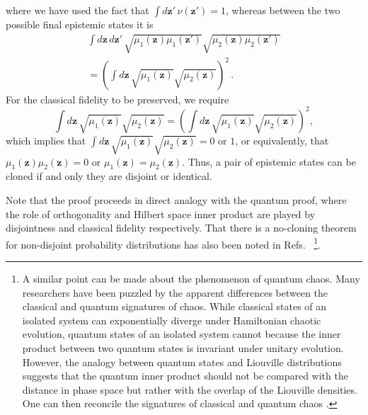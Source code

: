 \documentclass[pra,superscriptaddress,nofootinbib,12pt]{revtex4-2}
\begin{document}
where we have used the fact that $\int d\mathbf{z}'\,\nu(\mathbf{z}')=1$, whereas between the two possible
final epistemic states it is
\begin{multline}
  \int d\mathbf{z}\,d\mathbf{z}'\,\sqrt{\mu_{1}(\mathbf{z})\mu_{1}(\mathbf{z}')}\sqrt{\mu_{2}(\mathbf{z})\mu_{2}(\mathbf{z}')}  \\
  =\left( \int d\mathbf{z}\,\sqrt{\mu_{1}(\mathbf{z})}\sqrt{\mu_{2}(\mathbf{z})}\right)^{2}\,.
\end{multline}
For the classical fidelity to be preserved, we require
\begin{equation}
  \int d\mathbf{z}\,\sqrt{\mu_{1}(\mathbf{z})}\sqrt{\mu_{2}(\mathbf{z})}
  =\left( \int d\mathbf{z}\,\sqrt{\mu_{1}(\mathbf{z})}\sqrt{\mu_{2}(\mathbf{z})}\right)^{2},
\end{equation}
which implies that $\int d\mathbf{z}\,\sqrt{\mu_{1}(\mathbf{z})}\sqrt{\mu_{2}
(\mathbf{z})}=0$ or $1$, or equivalently, that $\mu_{1}(\mathbf{z})\mu_{2}
(\mathbf{z})=0$ or $\mu_{1}(\mathbf{z})=\mu_{2}(\mathbf{z})$.  Thus, a pair of
epistemic states can be cloned if and only they are
disjoint or identical.

Note that the proof proceeds in direct analogy with the quantum proof, where
the role of orthogonality and Hilbert space inner
product are played by disjointness and classical
fidelity respectively. That there is a no-cloning theorem for non-disjoint probability distributions has also been noted in Refs.~\cite{DPP02,CF96,Har99,Spe07}  \footnote{A similar point can be made about the phenomenon of quantum chaos. Many researchers have been puzzled by the apparent differences between the classical and quantum signatures of chaos. While classical states of an isolated system can exponentially diverge under Hamiltonian chaotic
evolution, quantum states of an isolated system cannot because the inner
product between two quantum states is invariant under unitary evolution.
However, the analogy between quantum states and Liouville distributions
suggests that the quantum inner product should not be compared with the
distance in phase space but rather with the overlap of the Liouville
densities. One can then reconcile the signatures of classical and quantum
chaos \cite{Bal94, Eme01, EmersonBallentine01}.}.


\end{document}

